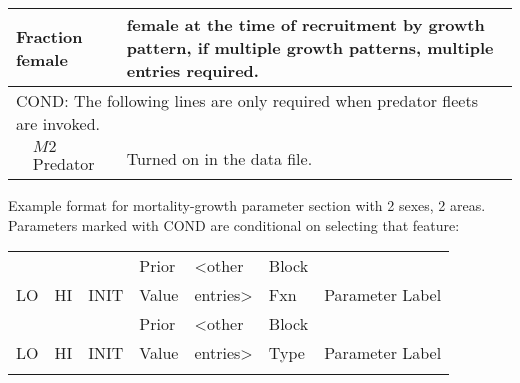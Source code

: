 \begin{longtable}{p{1cm} p{2.25cm} p{10cm}}
	\multicolumn{2}{l}{Fraction female}\Tstrut & \raisebox{0.1\ht\strutbox}{\hypertarget{SexRatio}{Fraction}} female at the time of recruitment by growth pattern, if multiple growth patterns, multiple entries required. \Bstrut\\
	\hline
	
	\multicolumn{3}{l}{COND: The following lines are only required when predator fleets are invoked.} \Tstrut\\
	& $M2$ Predator & Turned on in the data file. \\
	\hline
\end{longtable}


Example format for mortality-growth parameter section with 2 sexes, 2 areas.
Parameters marked with COND are conditional on selecting that feature:
\begin{longtable}{p{1.1cm} p{1.1cm} p{1.1cm} p{1.1cm} p{1.5cm} p{1.1cm} p{6.75cm}}
	\hline
	   &	&	   & Prior & <other & Block & \Tstrut\\
	LO & HI & INIT & Value & entries> & Fxn & Parameter Label \Bstrut\\
	\hline
	\endfirsthead

	\hline
	   &	&	   & Prior & <other & Block & \Tstrut\\
	LO & HI & INIT & Value & entries> & Type & Parameter Label \Bstrut\\
	\hline
	\endhead

	\hline
	\endfoot

	\endlastfoot


\end{longtable}
